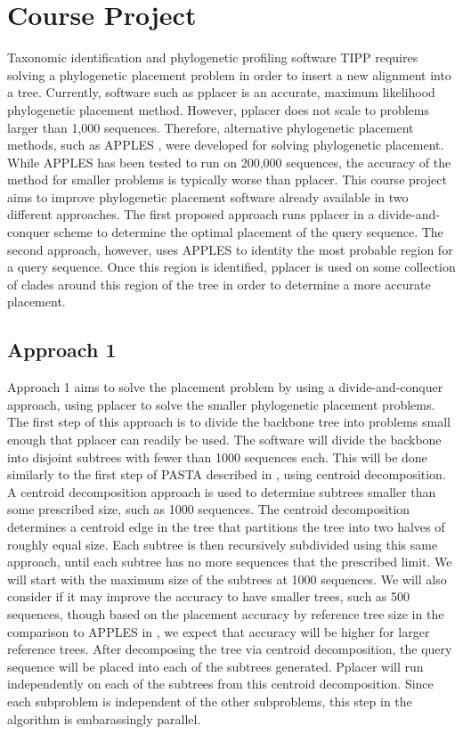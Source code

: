\documentclass[10pt]{article}
\begin{document}
\section{Course Project}

Taxonomic identification and phylogenetic profiling software TIPP
\cite{nguyen_tipp_2014} requires solving a phylogenetic placement problem in order to
insert a new alignment into a tree. Currently, software such as pplacer
\cite{matsen_pplacer_2010} is an accurate, maximum likelihood phylogenetic placement
method. However, pplacer does not scale to problems larger than 1,000
sequences. Therefore, alternative phylogenetic placement methods, such
as APPLES \cite{balaban_apples_2020}, were developed for solving phylogenetic placement.
While APPLES has been tested to run on 200,000 sequences, the accuracy
of the method for smaller problems is typically worse than pplacer. This
course project aims to improve phylogenetic placement software already
available in two different approaches. The first proposed approach runs
pplacer in a divide-and-conquer scheme to determine the optimal
placement of the query sequence. The second approach, however, uses
APPLES to identity the most probable region for a query sequence. Once
this region is identified, pplacer is used on some collection of clades
around this region of the tree in order to determine a more accurate
placement.

\subsection{Approach 1}

Approach 1 aims to solve the placement problem by using a
divide-and-conquer approach, using pplacer to solve the smaller
phylogenetic placement problems. The first step of this approach is to
divide the backbone tree into problems small enough that pplacer can
readily be used. The software will divide the backbone into disjoint
subtrees with fewer than 1000 sequences each. This will be done
similarly to the first step of PASTA described in \cite{PASTA}, using
centroid decomposition. A centroid decomposition approach is used to
determine subtrees smaller than some prescribed size, such as 1000
sequences. The centroid decomposition determines a centroid edge in the
tree that partitions the tree into two halves of roughly equal size.
Each subtree is then recursively subdivided using this same approach,
until each subtree has no more sequences that the prescribed limit. We
will start with the maximum size of the subtrees at 1000 sequences. We
will also consider if it may improve the accuracy to have smaller trees,
such as 500 sequences, though based on the placement accuracy by
reference tree size in the comparison to APPLES in \cite{balaban_apples_2020}, we expect
that accuracy will be higher for larger reference trees. After
decomposing the tree via centroid decomposition, the query sequence will
be placed into each of the subtrees generated. Pplacer will run
independently on each of the subtrees from this centroid decomposition.
Since each subproblem is independent of the other subproblems, this step
in the algorithm is embarassingly parallel.
\end{document}
